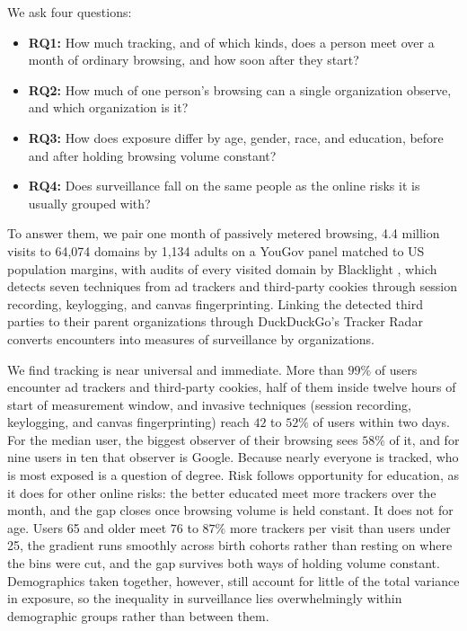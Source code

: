 \documentclass[12pt, letterpaper]{article}
\begin{document}
We ask four questions:
\onehalfspacing
\begin{itemize}\itemsep2pt
    \item \textbf{RQ1:} How much tracking, and of which kinds, does a person meet over a month of ordinary browsing, and how soon after they start?
    \item \textbf{RQ2:} How much of one person's browsing can a single organization observe, and which organization is it?
    \item \textbf{RQ3:} How does exposure differ by age, gender, race, and education, before and after holding browsing volume constant?
    \item \textbf{RQ4:} Does surveillance fall on the same people as the online risks it is usually grouped with?
\end{itemize}
\doublespacing
 
To answer them, we pair one month of passively metered browsing, 4.4 million visits to 64,074 domains by 1,134 adults on a YouGov panel matched to US population margins, with audits of every visited domain by Blacklight \citep{blacklight}, which detects seven techniques from ad trackers and third-party cookies through session recording, keylogging, and canvas fingerprinting. Linking the detected third parties to their parent organizations through DuckDuckGo's Tracker Radar converts encounters into measures of surveillance by organizations.

We find tracking is near universal and immediate. More than $99\%$ of users encounter ad trackers and third-party cookies, half of them inside twelve hours of start of measurement window, and invasive techniques (session recording, keylogging, and canvas fingerprinting) reach $42$ to $52\%$ of users within two days. For the median user, the biggest observer of their browsing sees $58\%$ of it, and for nine users in ten that observer is Google. Because nearly everyone is tracked, who is most exposed is a question of degree. Risk follows opportunity for education, as it does for other online risks: the better educated meet more trackers over the month, and the gap closes once browsing volume is held constant. It does not for age. Users 65 and older meet $76$ to $87\%$ more trackers per visit than users under 25, the gradient runs smoothly across birth cohorts rather than resting on where the bins were cut, and the gap survives both ways of holding volume constant. Demographics taken together, however, still account for little of the total variance in exposure, so the inequality in surveillance lies overwhelmingly within demographic groups rather than between them.
 
\end{document}
